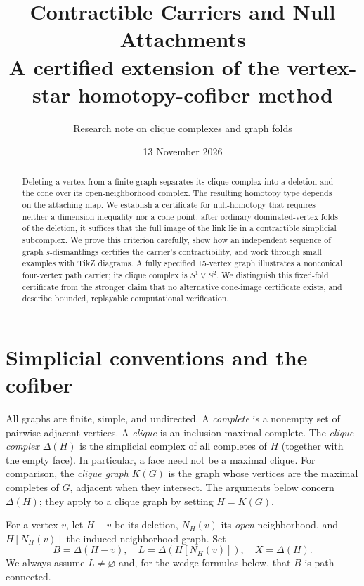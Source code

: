 \documentclass[11pt,letterpaper]{article}
\title{\textbf{Contractible Carriers and Null Attachments}\\[5pt]
\large A certified extension of the vertex-star homotopy-cofiber method}
\author{Research note on clique complexes and graph folds}
\date{13 November 2026}
\theoremstyle{definition}
\theoremstyle{remark}
\newcommand{\Del}{\Delta}
\newcommand{\N}{N}
\begin{document}
\maketitle
\begin{abstract}
Deleting a vertex from a finite graph separates its clique complex into a deletion and the cone over its open-neighborhood complex.  The resulting homotopy type depends on the attaching map.  We establish a certificate for null-homotopy that requires neither a dimension inequality nor a cone point: after ordinary dominated-vertex folds of the deletion, it suffices that the full image of the link lie in a contractible simplicial subcomplex.  We prove this criterion carefully, show how an independent sequence of graph \(s\)-dismantlings certifies the carrier's contractibility, and work through small examples with TikZ diagrams.  A fully specified 15-vertex graph illustrates a nonconical four-vertex path carrier; its clique complex is \(S^1\vee S^2\).  We distinguish this fixed-fold certificate from the stronger claim that no alternative cone-image certificate exists, and describe bounded, replayable computational verification.
\end{abstract}
\tableofcontents

\section{Simplicial conventions and the cofiber}
All graphs are finite, simple, and undirected. A \emph{complete} is a nonempty set of pairwise adjacent vertices. A \emph{clique} is an inclusion-maximal complete. The \emph{clique complex} \(\Del(H)\) is the simplicial complex of all completes of \(H\) (together with the empty face). In particular, a face need not be a maximal clique. For comparison, the \emph{clique graph} \(K(G)\) is the graph whose vertices are the maximal completes of \(G\), adjacent when they intersect. The arguments below concern \(\Del(H)\); they apply to a clique graph by setting \(H=K(G)\).

For a vertex \(v\), let \(H-v\) be its deletion, \(\N_H(v)\) its \emph{open} neighborhood, and \(H[\N_H(v)]\) the induced neighborhood graph. Set
\[
 B=\Del(H-v),\quad L=\Del(H[\N_H(v)]),\quad X=\Del(H).
\]
We always assume \(L\ne\varnothing\) and, for the wedge formulas below, that \(B\) is path-connected.
\end{document}
